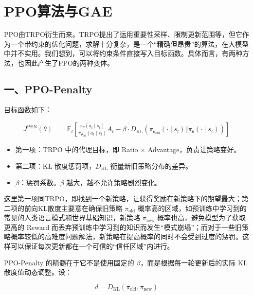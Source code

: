 \clearpage

\hypertarget{ppoux7b97ux6cd5ux4e0egae}{%
\section{PPO算法与GAE}\label{ppoux7b97ux6cd5ux4e0egae}}

PPO由TRPO衍生而来。TRPO提出了运用重要性采样、限制更新范围等，但它作为一个带约束的优化问题，求解十分复杂，是一个``精确但昂贵''的算法，在大模型中并不实用。我们想到，可以将约束条件直接写入目标函数。具体而言，有两种方法，也因此产生了PPO的两种变体。

\hypertarget{ux4e00ppo-penalty}{%
\subsection{一、PPO-Penalty}\label{ux4e00ppo-penalty}}

目标函数如下：

\[
\begin{aligned}
J^{\mathrm{PEN}}(\theta)
&=
\mathbb{E}_t\left[
\frac{\pi_\theta(a_t\mid s_t)}
{\pi_{\theta_{\mathrm{old}}}(a_t\mid s_t)}
A_t
-
\beta\cdot
D_{\mathrm{KL}}\left(
\pi_{\theta_{\mathrm{old}}}(\cdot\mid s_t)
\Vert
\pi_\theta(\cdot\mid s_t)
\right)
\right]
\end{aligned}
\]

\begin{itemize}
\tightlist
\item
  第一项：TRPO 中的代理目标，即 Ratio \(\times\) Advantage，负责让策略变好。
\item
  第二项：KL 散度惩罚项，\(D_{\mathrm{KL}}\) 衡量新旧策略分布的差异。
\item
  \(\beta\)：惩罚系数。\(\beta\) 越大，越不允许策略剧烈变化。
\end{itemize}

这里第一项同TRPO，即找到一个新策略，让获得奖励在新策略下的期望最大；第二项的前向KL散度主要意在确保旧策略 \(\pi_{\mathrm{old}}\) 概率高的区域，如预训练中学习到的常见的人类语言模式和世界基础知识，新策略 \(\pi_{\mathrm{new}}\) 概率也高，避免模型为了获取更高的 Reward 而丢弃预训练中学习到的知识而发生``模式崩塌''；而对于一些旧策略概率较低的高难度问题解法，新策略在提高概率的同时不会受到过度的惩罚。这样可以保证每次更新都在一个可信的``信任区域''内进行。

PPO-Penalty 的精髓在于它不是使用固定的 \(\beta\)，而是根据每一轮更新后的实际 KL 散度值动态调整。设：

\[
d = D_{\mathrm{KL}}(\pi_{\mathrm{old}},\pi_{\mathrm{new}})
\]

